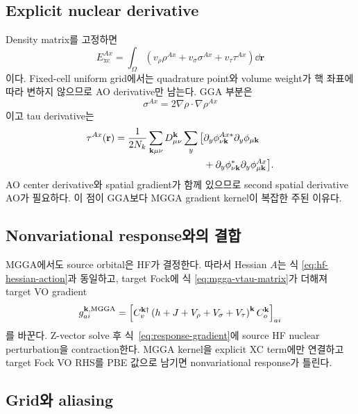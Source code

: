 \subsection{Explicit nuclear derivative}

Density matrix를 고정하면
\begin{equation}
  E_{\mathrm{xc}}^{Ax}
  =\int_\Omega\left(
    v_\rho\rho^{Ax}
    +v_\sigma\sigma^{Ax}
    +v_\tau\tau^{Ax}\right)\dd\mathbf r
  \label{eq:mgga-xc-derivative}
\end{equation}
이다. Fixed-cell uniform grid에서는 quadrature point와 volume weight가 핵 좌표에 따라
변하지 않으므로 AO derivative만 남는다. GGA 부분은
\begin{equation}
  \sigma^{Ax}=2\nabla\rho\cdot\nabla\rho^{Ax}
  \label{eq:mgga-sigma-derivative}
\end{equation}
이고 tau derivative는
\begin{align}
  \tau^{Ax}(\mathbf r)
  =\frac{1}{2N_k}\sum_{\mathbf{k}\mu\nu}D_{\mu\nu}^{\mathbf{k}}
   \sum_y\big[&
   \partial_y\phi_{\nu\mathbf{k}}^{Ax *}
   \partial_y\phi_{\mu\mathbf{k}}
  \notag\\
   &+\partial_y\phi_{\nu\mathbf{k}}^{*}
   \partial_y\phi_{\mu\mathbf{k}}^{Ax}\big].
  \label{eq:mgga-tau-derivative}
\end{align}
AO center derivative와 spatial gradient가 함께 있으므로 second spatial derivative AO가
필요하다. 이 점이 GGA보다 MGGA gradient kernel이 복잡한 주된 이유다.

\subsection{Nonvariational response와의 결합}

MGGA에서도 source orbital은 HF가 결정한다. 따라서 Hessian $A$는 식
\eqref{eq:hf-hessian-action}과 동일하고, target Fock에 식
\eqref{eq:mgga-vtau-matrix}가 더해져 target VO gradient
\begin{equation}
  g_{ai}^{\mathbf{k},\mathrm{MGGA}}
  =\left[C_v^{\mathbf{k}\dagger}
   \left(h+J+V_\rho+V_\sigma+V_\tau\right)^{\mathbf{k}}
   C_o^{\mathbf{k}}\right]_{ai}
  \label{eq:mgga-target-vo}
\end{equation}
를 바꾼다. Z-vector solve 후 식~\eqref{eq:response-gradient}에 source HF nuclear
perturbation을 contraction한다. MGGA kernel을 explicit XC term에만 연결하고 target Fock
VO RHS를 PBE 값으로 남기면 nonvariational response가 틀린다.

\subsection{Grid와 aliasing}

